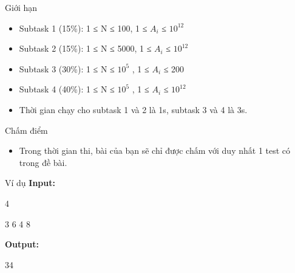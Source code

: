 Giới hạn
\begin{itemize}
	\item     Subtask 1 (15\%): 1 ≤ N ≤ 100, 1 ≤ $A_{i}$    ≤ $10^{12}$
	\item     Subtask 2 (15\%): 1 ≤ N ≤ 5000, 1 ≤ $A_{i}$    ≤ $10^{12}$
	\item     Subtask 3 (30\%): 1 ≤ N ≤ $10^{5}$    , 1 ≤ $A_{i}$    ≤ 200   
	\item     Subtask 4 (40\%): 1 ≤ N ≤ $10^{5}$    , 1 ≤ $A_{i}$    ≤ $10^{12}$
	\item     Thời gian chạy cho subtask 1 và 2 là 1s, subtask 3 và 4 là 3s.   
\end{itemize}
Chấm điểm
\begin{itemize}
	\item     Trong thời gian thi, bài của bạn sẽ chỉ được chấm với duy nhất 1 test có trong đề bài.   
\end{itemize}
Ví dụ
\textbf{    Input:   }

   4   


   3 6 4 8  

\textbf{    Output:   }

   34